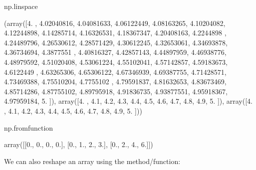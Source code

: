 \documentclass[letterpaper,10pt,english]{sphinxmanual}
\begin{document}
\begin{sphinxVerbatim}[commandchars=\\\{\}]
np.linspace
    
\end{sphinxVerbatim}

\begin{sphinxVerbatim}[commandchars=\\\{\}]
(array([4.        , 4.02040816, 4.04081633, 4.06122449, 4.08163265,
        4.10204082, 4.12244898, 4.14285714, 4.16326531, 4.18367347,
        4.20408163, 4.2244898 , 4.24489796, 4.26530612, 4.28571429,
        4.30612245, 4.32653061, 4.34693878, 4.36734694, 4.3877551 ,
        4.40816327, 4.42857143, 4.44897959, 4.46938776, 4.48979592,
        4.51020408, 4.53061224, 4.55102041, 4.57142857, 4.59183673,
        4.6122449 , 4.63265306, 4.65306122, 4.67346939, 4.69387755,
        4.71428571, 4.73469388, 4.75510204, 4.7755102 , 4.79591837,
        4.81632653, 4.83673469, 4.85714286, 4.87755102, 4.89795918,
        4.91836735, 4.93877551, 4.95918367, 4.97959184, 5.        ]),
 array([4. , 4.1, 4.2, 4.3, 4.4, 4.5, 4.6, 4.7, 4.8, 4.9, 5. ]),
 array([4. , 4.1, 4.2, 4.3, 4.4, 4.5, 4.6, 4.7, 4.8, 4.9, 5. ]))
\end{sphinxVerbatim}

\begin{sphinxVerbatim}[commandchars=\\\{\}]
np.fromfunction
        
\end{sphinxVerbatim}

\begin{sphinxVerbatim}[commandchars=\\\{\}]
array([[0., 0., 0., 0.],
       [0., 1., 2., 3.],
       [0., 2., 4., 6.]])
\end{sphinxVerbatim}

We can also reshape an array using the  method/function:
\end{document}
